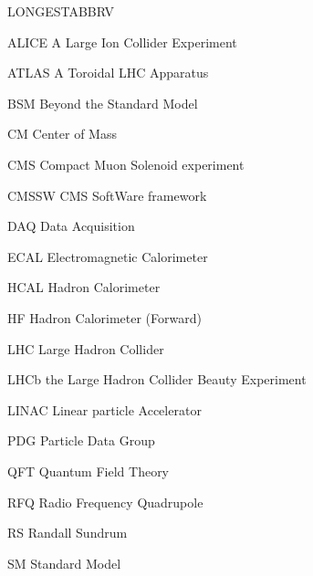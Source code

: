 \begin{theglossary}{LONGESTABBRV}
\item[ALICE]  A Large Ion Collider Experiment
\item[ATLAS]  A Toroidal LHC Apparatus
\item[BSM] Beyond the Standard Model
\item[CM] Center of Mass
\item[CMS] Compact Muon Solenoid experiment
\item[CMSSW] CMS SoftWare framework
\item[DAQ] Data Acquisition
\item[ECAL] Electromagnetic Calorimeter
\item[HCAL] Hadron Calorimeter
\item[HF] Hadron Calorimeter (Forward) 
\item[LHC] Large Hadron Collider
\item[LHCb] the Large Hadron Collider Beauty Experiment
\item[LINAC] Linear particle Accelerator
\item[PDG] Particle Data Group
\item[QFT] Quantum Field Theory
\item[RFQ] Radio Frequency Quadrupole
\item[RS] Randall Sundrum
\item[SM] Standard Model

\end{theglossary}
